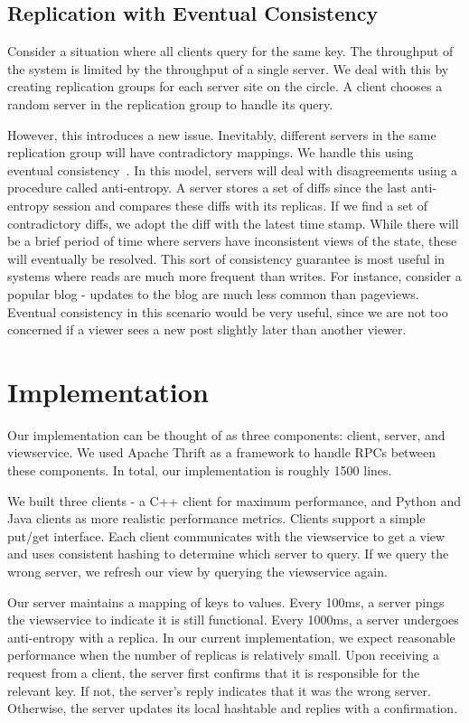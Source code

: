 \documentclass[letterpaper,11pt]{article}
\begin{document}
     \subsection{Replication with Eventual Consistency}
     Consider a situation where all clients query for the same key.
     The throughput of the system is limited by the throughput of a single server.
     We deal with this by creating replication groups for each server site on the circle.
     A client chooses a random server in the replication group to handle its query.

     However, this introduces a new issue.
     Inevitably, different servers in the same replication group will have contradictory mappings.
     We handle this using eventual consistency~\cite{bayou}.
     In this model, servers will deal with disagreements using a procedure called anti-entropy.
     A server stores a set of diffs since the last anti-entropy session and compares these diffs with its replicas.
     If we find a set of contradictory diffs, we adopt the diff with the latest time stamp.
     While there will be a brief period of time where servers have inconsistent views of the state, these will eventually be resolved.
     This sort of consistency guarantee is most useful in systems where reads are much more frequent than writes.
     For instance, consider a popular blog - updates to the blog are much less common than pageviews.
     Eventual consistency in this scenario would be very useful, since we are not too concerned if a viewer sees a new post slightly later than another viewer.


     \section{Implementation}
     Our implementation can be thought of as three components: client, server, and viewservice.
     We used Apache Thrift as a framework to handle RPCs between these components.
     In total, our implementation is roughly 1500 lines.

     We built three clients - a C++ client for maximum performance, and Python and Java clients as more realistic performance metrics.
     Clients support a simple put/get interface.
     Each client communicates with the viewservice to get a view and uses consistent hashing to determine which server to query.
     If we query the wrong server, we refresh our view by querying the viewservice again.

     Our server maintains a mapping of keys to values.
     Every 100ms, a server pings the viewservice to indicate it is still functional.
     Every 1000ms, a server undergoes anti-entropy with a replica.
     In our current implementation, we expect reasonable performance when the number of replicas is relatively small.
     Upon receiving a request from a client, the server first confirms that it is responsible for the relevant key.
     If not, the server's reply indicates that it was the wrong server.
     Otherwise, the server updates its local hashtable and replies with a confirmation.
\end{document}
